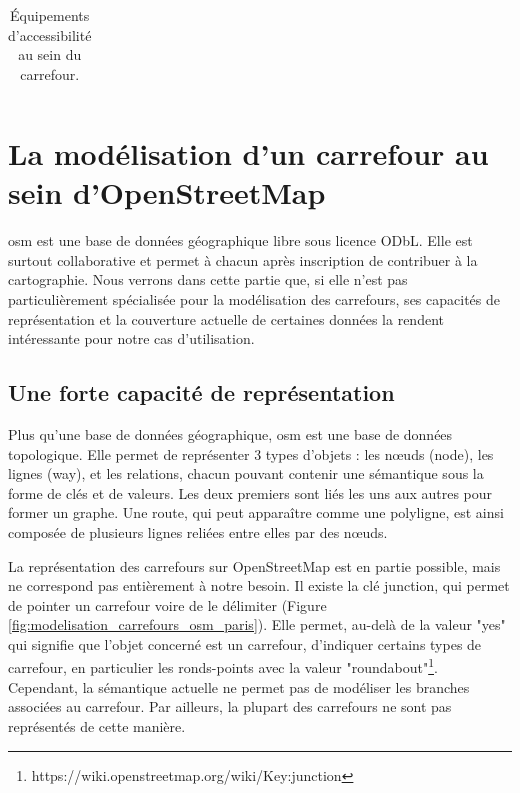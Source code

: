 \begin{table}
\begin{center}
\begin{tabular}{ c | m{3cm} | m{10cm} }
    \end{tabular}
    \end{center}
    \caption{Équipements d'accessibilité au sein du carrefour.}
    \label{tab:modelisation_objets}
\end{table}


\todo{}

\section{La modélisation d’un carrefour au sein d’OpenStreetMap}


\gls{osm} est une base de données géographique libre sous licence ODbL. Elle est surtout collaborative et permet à chacun après inscription de contribuer à la cartographie. Nous verrons dans cette partie que, si elle n'est pas particulièrement spécialisée pour la modélisation des carrefours, ses capacités de représentation et la couverture actuelle de certaines données la rendent intéressante pour notre cas d'utilisation.

\subsection{Une forte capacité de représentation}

Plus qu'une base de données géographique, \gls{osm} est une base de données topologique. Elle permet de représenter 3 types d'objets : les nœuds (node), les lignes (way), et les relations, chacun pouvant contenir une sémantique sous la forme de clés et de valeurs. Les deux premiers sont liés les uns aux autres pour former un graphe. Une route, qui peut apparaître comme une polyligne, est ainsi composée de plusieurs lignes reliées entre elles par des nœuds. 


La représentation des carrefours sur OpenStreetMap est en partie possible, mais ne correspond pas entièrement à notre besoin. Il existe la clé junction, qui permet de pointer un carrefour voire de le délimiter (Figure \ref{fig:modelisation_carrefours_osm_paris}). Elle permet, au-delà de la valeur "yes" qui signifie que l'objet concerné est un carrefour, d'indiquer certains types de carrefour, en particulier les ronds-points avec la valeur "roundabout"\footnote{https://wiki.openstreetmap.org/wiki/Key:junction}. Cependant, la sémantique actuelle ne permet pas de modéliser les branches associées au carrefour. Par ailleurs, la plupart des carrefours ne sont pas représentés de cette manière.

